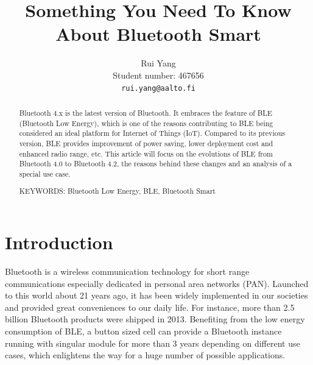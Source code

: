 \documentclass{cseminar}
\begin{document}

\title{Something You Need To Know About Bluetooth Smart}

\author{Rui Yang\\
        Student number: 467656\\
	\texttt{rui.yang@aalto.fi}}
\maketitle


\begin{abstract}
Bluetooth 4.x is the latest version of Bluetooth. It embraces the feature of BLE (Bluetooth Low Energy), which is one of the reasons contributing to BLE being considered an ideal platform for Internet of Things (IoT). Compared to its previous version, BLE provides improvement of power saving, lower deployment cost and enhanced radio range, etc\cite{BLE03}. This article will focus on the evolutions of BLE from Bluetooth 4.0 to Bluetooth 4.2, the reasons behind these changes and an analysis of a special use case.

\vspace{3mm}
\noindent KEYWORDS: Bluetooth Low Energy, BLE, Bluetooth Smart

\end{abstract}


\section{Introduction}
Bluetooth is a wireless communication technology for short range communications especially dedicated in personal area networks (PAN). Launched to this world about 21 years ago, it has been widely implemented in our societies and provided great conveniences to our daily life. For instance, more than 2.5 billion Bluetooth products were shipped in 2013\cite{BLE04}. Benefiting from the low energy consumption of BLE, a button sized cell can provide a Bluetooth instance running with singular module for more than 3 years depending on different use cases\cite{BLE03}, which enlightens the way for a huge number of possible applications.
\end{document}
